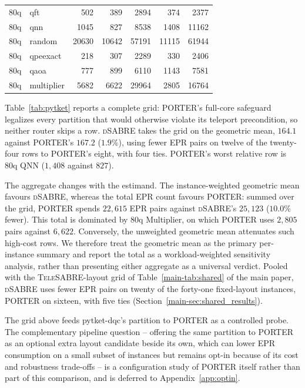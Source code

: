 \documentclass[journal]{IEEEtran}
\newcommand{\PORTER}{\textsc{PORTER}}
\newcommand{\TeleSABRE}{\textsc{TeleSABRE}}
\newcommand{\dSABRE}{\textsc{dSABRE}}
\newcommand{\mainSharedResults}{Section~\ref{main-sec:shared_results}}
\newcommand{\mainSharedTable}{Table~\ref{main-tab:shared}}
\begin{document}
\begin{table}[t]
{\begin{tabular}{@{}l l r rr rr@{}}
80q & qft        &  502 &  389 & 2894 &  374 & 2377 \\
80q & qnn        & 1045 &  827 & 8538 & 1408 & 11162 \\
80q & random     & 20630 & 10642 & 57191 & 11115 & 61944 \\
80q & qpeexact   &  218 &  307 & 2289 &  330 & 2406 \\
80q & qaoa       &  777 &  899 & 6110 & 1143 & 7581 \\
80q & multiplier & 5682 & 6622 & 29964 & 2805 & 16764 \\
\bottomrule
\end{tabular}%
}
\end{table}

Table~\ref{tab:pytket} reports a complete grid: \PORTER{}'s full-core
safeguard legalizes every partition that would otherwise violate its
teleport precondition, so neither router skips a row. \dSABRE{} takes
the grid on the geometric mean, $164.1$ against \PORTER{}'s $167.2$
($1.9\%$), using fewer EPR pairs on twelve of the twenty-four rows to
\PORTER{}'s eight, with four ties. \PORTER{}'s worst relative row is
80q QNN ($1{,}408$ against $827$).

The aggregate changes with the estimand. The instance-weighted geometric
mean favours \dSABRE{}, whereas the total EPR count favours \PORTER{}:
summed over the grid, \PORTER{} spends $22{,}615$ EPR pairs against
\dSABRE{}'s $25{,}123$ ($10.0\%$ fewer). This total is dominated by 80q
Multiplier, on which \PORTER{} uses $2{,}805$ pairs against $6{,}622$.
Conversely, the unweighted geometric mean attenuates such high-cost rows.
We therefore treat the geometric mean as the primary per-instance summary
and report the total as a workload-weighted sensitivity analysis, rather
than presenting either aggregate as a universal verdict.
Pooled with the \TeleSABRE{}-layout grid of \mainSharedTable{} of the
main paper, \dSABRE{} uses fewer EPR pairs on twenty of the forty-one
fixed-layout instances, \PORTER{} on sixteen, with five ties
(\mainSharedResults{}).

The grid above feeds pytket-dqc's partition to \PORTER{} as a
controlled probe. The complementary pipeline question -- offering the
same partition to \PORTER{} as an optional extra layout candidate
beside its own, which can lower EPR consumption on a small subset of
instances but remains opt-in because of its cost and robustness trade-offs -- is a configuration study of \PORTER{} itself
rather than part of this comparison, and is deferred to
Appendix~\ref{app:optin}.
\end{document}
